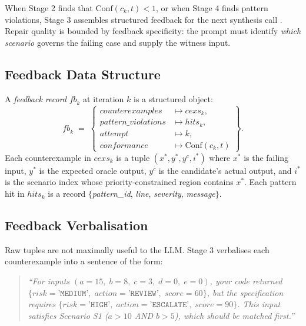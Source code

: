 When Stage 2 finds that $\mathrm{Conf}(c_k, t) < 1$, or when Stage 4 finds
pattern violations, Stage 3 assembles structured feedback for the next
synthesis call \citep{lynn2024verifierloop, solarlezama2008sketching}.
Repair quality is bounded by feedback specificity: the prompt must identify
\emph{which scenario} governs the failing case and supply the witness input.

\subsection{Feedback Data Structure}
\label{subsec:method:feedback-struct}

\begin{definition}
\label{def:feedback}
A \emph{feedback record} $\mathit{fb}_k$ at iteration $k$ is a structured
object:
\[
  \mathit{fb}_k \;=\;
  \left\{
  \begin{aligned}
    \mathit{counterexamples}     &\mapsto \mathit{cexs}_k,\\
    \mathit{pattern\_violations} &\mapsto \mathit{hits}_k,\\
    \mathit{attempt}            &\mapsto k,\\
    \mathit{conformance}        &\mapsto \mathrm{Conf}(c_k, t)
  \end{aligned}
  \right\}.
\]
Each counterexample in $\mathit{cexs}_k$ is a tuple
$(x^*, y^*, y^c, i^*)$ where $x^*$ is the failing input, $y^*$ is the
expected oracle output, $y^c$ is the candidate's actual output, and $i^*$ is
the scenario index whose priority-constrained region contains $x^*$.
Each pattern hit in $\mathit{hits}_k$ is a record $\{$\textit{pattern\_id},
\textit{line}, \textit{severity}, \textit{message}$\}$.
\end{definition}

\subsection{Feedback Verbalisation}
\label{subsec:method:verbalise}

Raw tuples are not maximally useful to the LLM.  Stage 3 verbalises each
counterexample into a sentence of the form:

\begin{quote}
  \textit{``For inputs $(a=15,\; b=8,\; c=3,\; d=0,\; e=0)$, your code
  returned $\{\textit{risk}=\texttt{'MEDIUM'},\; \textit{action}=
  \texttt{'REVIEW'},\; \textit{score}=60\}$, but the specification requires
  $\{\textit{risk}=\texttt{'HIGH'},\; \textit{action}=\texttt{'ESCALATE'},
  \; \textit{score}=90\}$.  This input satisfies Scenario S1
  ($a > 10$ AND $b > 5$), which should be matched first.''}
\end{quote}

